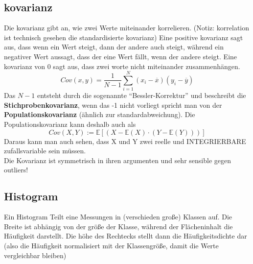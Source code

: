 \documentclass{article}
\begin{document}
	\subsection{kovarianz}
	Die kovarianz gibt an, wie zwei Werte miteinander korrelieren. (Notiz: korrelation ist technisch gesehen die standardisierte kovarianz)
	Eine positive kovarianz sagt aus, dass wenn ein Wert steigt, dann der andere auch steigt, während ein negativer Wert aussagt, dass der eine Wert fällt, wenn der andere steigt. Eine kovarianz von 0 sagt aus, dass zwei worte nicht miteinander zusammenhängen.\\
	\[Cov(x,y) = \frac{1}{N-1}\sum\limits^N_{i=1} (x_i-\overline{x})(y_i-\overline{y})\]
	Das $N-1$ entsteht durch die sogenannte ``Bessler-Korrektur'' und beschreibt die \textbf{Stichprobenkovarianz}, wenn das -1 nicht vorliegt spricht man von der \textbf{Populationskovarianz} (ähnlich zur standardabweichung).
	Die Populationskovarianz kann deshalb auch als
	\[Cov(X,Y) := \mathbb{E}[(X-\mathbb{E}(X)\cdot(Y-\mathbb{E}(Y)))]\]
	Daraus kann man auch sehen, dass X und Y zwei reelle und INTEGRIERBARE zufallsvariable sein müssen.\\
	Die Kovarianz ist symmetrisch in ihren argumenten und sehr sensible gegen outliers!
	\subsection{Histogram}
	Ein Histogram Teilt eine Messungen in (verschieden große) Klassen auf. Die Breite ist abhängig von der größe der Klasse, während der Flächeninhalt die Häufigkeit darstellt.
	Die höhe des Rechtecks stellt dann die Häufigkeitsdichte dar (also die Häufigkeit normalisiert mit der Klassengröße, damit die Werte vergleichbar bleiben)\\
\end{document}
